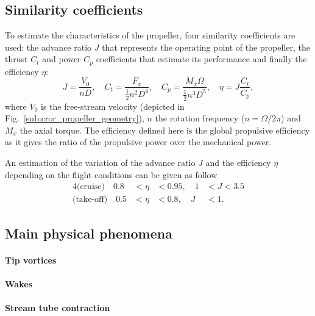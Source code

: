 \subsection{Similarity coefficients}
\label{sub:similarity_coefficients}
To estimate the characteristics of the propeller, four similarity
coefficients are used:
the advance ratio $J$ that represents the operating point of the propeller,
the thrust $C_t$ and power $C_p$ coefficients that estimate its performance and finally
the efficiency $\eta$:
\begin{equation}
    J = \frac{V_0}{n D}, \quad
    C_t = \frac{F_x}{\frac{1}{2} n ^ 2  D ^ 4}, \quad
    C_p = \frac{M_x \Omega}{\frac{1}{2} n ^ 3 D ^ 5}, \quad
    \eta = J \frac{C_t}{C_p},
\end{equation}
where $V_0$ is the free-stream velocity 
(depicted in Fig.~\ref{sub:cror_propeller_geometry}), 
$n$ the rotation frequency ($n = \Omega / 2 \pi$) and
$M_x$ the axial torque.
The efficiency defined here is the global propulsive efficiency
as it gives the ratio of the propulsive power over the mechanical power.

An estimation of the variation of the advance ratio $J$ and the 
efficiency $\eta$ depending on the flight conditions can be given as follow
\begin{alignat}{4}
    \text{(cruise)} \quad  0.8 &< \eta &< 0.95, \quad 1 &< J < 3.5 \\
    \text{(take-off)} \quad  0.5 &< \eta &< 0.8, \quad J &< 1.
\end{alignat}

\subsection{Main physical phenomena}
\label{sub:cror_propeller_physics}

\paragraph{Tip vortices}

\paragraph{Wakes}

\paragraph{Stream tube contraction}
